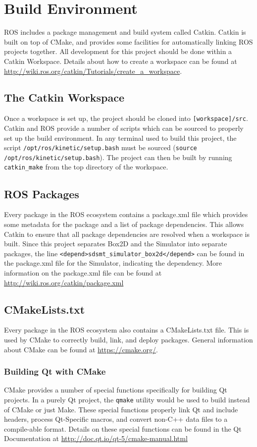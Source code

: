 \section{Build  Environment} \label{sec:buildenv}
ROS includes a package management and build system called Catkin. Catkin is built on top of CMake, and provides some facilities for automatically linking ROS projects together.
All development for this project should be done within a Catkin Workspace. Details about how to create a workspace can be found at \url{http://wiki.ros.org/catkin/Tutorials/create_a_workspace}. 

\subsection{The Catkin Workspace}
Once a workspace is set up, the project should be cloned into \lstinline|[workspace]/src|.
Catkin and ROS provide a number of scripts which can be sourced to properly set up the build environment. In any terminal used to build this project, the script \lstinline|/opt/ros/kinetic/setup.bash| must be sourced (\lstinline|source /opt/ros/kinetic/setup.bash|). The project can then be built by running \lstinline|catkin_make| from the top directory of the workspace.

\subsection{ROS Packages}
Every package in the ROS ecosystem contains a package.xml file which provides some metadata for the package and a list of package dependencies. This allows Catkin to ensure that all package dependencies are resolved when a workspace is built. Since this project separates Box2D and the Simulator into separate packages, the line \lstinline|<depend>sdsmt_simulator_box2d</depend>| can be found in the package.xml file for the Simulator, indicating the dependency.  More information on the package.xml file can be found at \url{http://wiki.ros.org/catkin/package.xml}

\subsection{CMakeLists.txt}
Every package in the ROS ecosystem also contains a CMakeLists.txt file. This is used by CMake to correctly build, link, and deploy packages. General information about CMake can be found at \url{https://cmake.org/}.

\subsubsection*{Building Qt with CMake}
CMake provides a number of special functions specifically for building Qt projects. In a purely Qt project, the \lstinline|qmake| utility would be used to build instead of CMake or just Make. These special functions properly link Qt and include headers, process Qt-Specific macros, and convert non-C++ data files to a compile-able format. Details on these special functions can be found in the Qt Documentation at \url{http://doc.qt.io/qt-5/cmake-manual.html}

